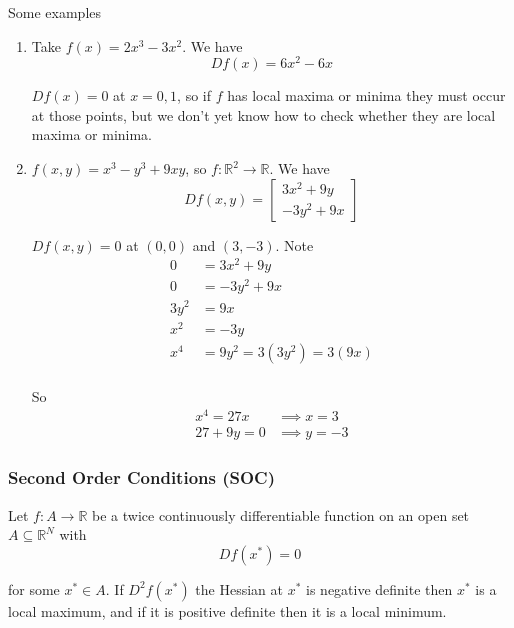 \documentclass{article}
\begin{document}
Some examples
\begin{enumerate}
  \item Take $f(x) = 2x^3 - 3x^2$. We have
    \[
      D f(x) = 6x^2 - 6x
    \]

    $Df(x) = 0$ at $x = 0, 1$, so if $f$ has local maxima or minima they must occur at those points, but we don't yet know how to check whether they are local maxima or minima.

  \item $f(x, y) = x^3 - y^3 + 9xy$, so $f: \mathbb{R}^2 \to \mathbb{R}$. We have
    \[
      D f(x, y) = \left[\begin{matrix}
        3x^2 + 9y \\
        -3y^2 + 9x
      \end{matrix}\right]
    \]

    $Df(x, y) = 0$ at $(0, 0)$ and $(3, -3)$. Note
    \begin{align*}
      0    & = 3x^2 + 9y \\
      0    & = -3y^2 + 9x \\
      3y^2 & = 9x \\
      x^2  & = -3y \\
      x^4  & = 9y^2 = 3(3y^2) = 3(9x) \\
    \end{align*}

    So
    \begin{equation}
      \begin{array}{rcl}
      x^4     = 27x & \implies x = 3 \\
      27 + 9y = 0   & \implies y = -3
      \end{array}
      \nonumber
    \end{equation}
\end{enumerate}

\subsubsection{Second Order Conditions (SOC)}
\label{ssub:second_order_conditions_soc_}

\begin{theorem}
  Let $f: A \to \mathbb{R}$ be a twice continuously differentiable function on an open set $A \subseteq \mathbb{R}^N$ with
  \[
    D f(x^*) = 0
  \]

  for some $x^* \in A$. If $D^2 f(x^*)$ the Hessian at $x^*$ is negative definite then $x^*$ is a local maximum, and if it is positive definite then it is a local minimum.
\end{theorem}
\end{document}
